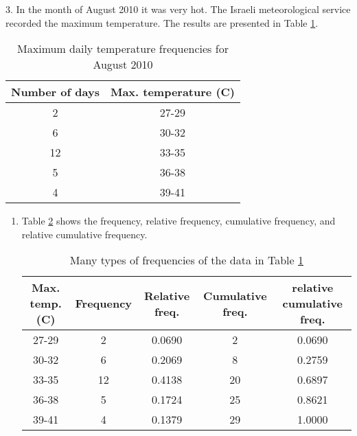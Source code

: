 \documentclass[fleqn]{article}
\begin{document}
\begin{answers}
	\item[3.]
	In the month of August 2010 it was very hot. The Israeli meteorological service recorded the maximum temperature. The results are presented in Table \ref{q3-temperature}.
	\begin{table}
		\centering
		\begin{tabular}{||c|c||}
			\hline
			Number of days & Max. temperature (\degree C) \\
			\hline
			2	& 27-29 \\
			6	& 30-32 \\
			12	& 33-35 \\
			5	& 36-38 \\
			4	& 39-41 \\
			\hline
		\end{tabular}
		\caption{Maximum daily temperature frequencies for August 2010}
		\label{q3-temperature}
	\end{table}
	\begin{enumerate}
		\item %
		Table \ref{q3-frequencies} shows the frequency, relative frequency, cumulative frequency, and relative cumulative frequency.
		\begin{table}[ht]
			\centering
			\begin{tabular}{||c||c|c|c|c||}
				\hline
				Max. temp. (\degree C) & Frequency & Relative freq. & Cumulative freq. & relative cumulative freq. \\
				\hline
				27-29 & 2	& 0.0690 & 2	& 0.0690 \\
				30-32 & 6	& 0.2069 & 8	& 0.2759 \\
				33-35 & 12	& 0.4138 & 20	& 0.6897 \\
				36-38 & 5	& 0.1724 & 25	& 0.8621 \\
				39-41 & 4	& 0.1379 & 29	& 1.0000 \\
				\hline
			\end{tabular}
			\caption{Many types of frequencies of the data in Table \ref{q3-temperature}}
			\label{q3-frequencies}
		\end{table}


\end{enumerate}
\end{answers}
\end{document}
